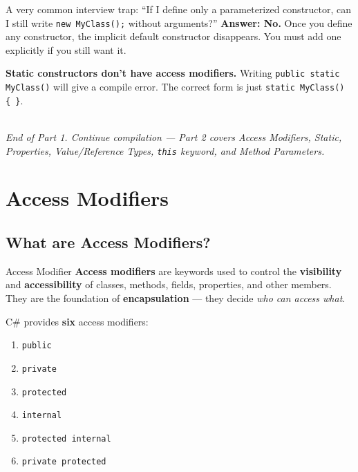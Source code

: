 \documentclass[11pt,a4paper]{article}
\begin{document}
\begin{tipBox}
A very common interview trap: ``If I define only a parameterized constructor, can I still write \texttt{new MyClass();} without arguments?'' \textbf{Answer: No.} Once you define any constructor, the implicit default constructor disappears. You must add one explicitly if you still want it.
\end{tipBox}

\begin{gotchaBox}
\textbf{Static constructors don't have access modifiers.} Writing \texttt{public static MyClass()} will give a compile error. The correct form is just \texttt{static MyClass() \{ \}}.
\end{gotchaBox}

\vspace{0.5cm}
\noindent\hrulefill\\[-4pt]
\textit{\small End of Part 1. Continue compilation — Part 2 covers Access Modifiers, Static, Properties, Value/Reference Types, \texttt{this} keyword, and Method Parameters.}

\clearpage
\section{Access Modifiers}

\subsection{What are Access Modifiers?}

\begin{defnBox}{Access Modifier}
\textbf{Access modifiers} are keywords used to control the \textbf{visibility} and \textbf{accessibility} of classes, methods, fields, properties, and other members. They are the foundation of \textbf{encapsulation} — they decide \textit{who can access what}.
\end{defnBox}

C\# provides \textbf{six} access modifiers:

\begin{enumerate}[leftmargin=*]
    \item \texttt{public}
    \item \texttt{private}
    \item \texttt{protected}
    \item \texttt{internal}
    \item \texttt{protected internal}
    \item \texttt{private protected}
\end{enumerate}
\end{document}
